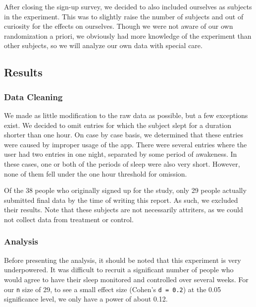 \documentclass[]{article}
\begin{document}
After closing the sign-up survey, we decided to also included ourselves
as subjects in the experiment. This was to slightly raise the number of
subjects and out of curiosity for the effects on ourselves. Though we
were not aware of our own randomization a priori, we obviously had more
knowledge of the experiment than other subjects, so we will analyze our
own data with special care.

\hypertarget{results}{%
\subsection{Results}\label{results}}

\hypertarget{data-cleaning}{%
\subsubsection{Data Cleaning}\label{data-cleaning}}

We made as little modification to the raw data as possible, but a few
exceptions exist. We decided to omit entries for which the subject slept
for a duration shorter than one hour. On case by case basis, we
determined that these entries were caused by improper usage of the app.
There were several entries where the user had two entries in one night,
separated by some period of awakeness. In these cases, one or both of
the periods of sleep were also very short. However, none of them fell
under the one hour threshold for omission.

Of the 38 people who originally signed up for the study, only 29 people
actually submitted final data by the time of writing this report. As
such, we excluded their results. Note that these subjects are not
necessarily attriters, as we could not collect data from treatment or
control.

\hypertarget{analysis}{%
\subsubsection{Analysis}\label{analysis}}

Before presenting the analysis, it should be noted that this experiment
is very underpowered. It was difficult to recruit a significant number
of people who would agree to have their sleep monitored and controlled
over several weeks. For our \texttt{n} size of 29, to see a small effect
size (Cohen's \texttt{d\ =\ 0.2}) at the 0.05 significance level, we
only have a power of about 0.12.
\end{document}
